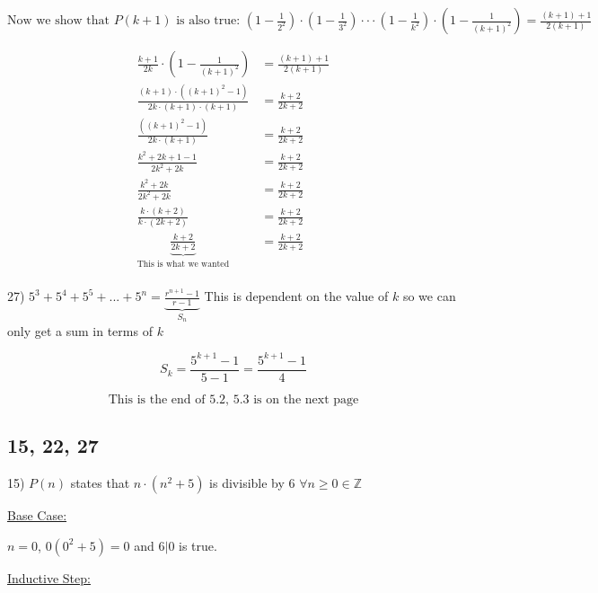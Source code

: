 \documentclass[11pt]{article}
\begin{document}
\begin{flushleft}
$\text{Now we show that $P(k+1)$ is also true: }
\displaystyle{\left(1-\frac{1}{2^2}\right)\cdot\left(1-\frac{1}{3^2}\right)\cdot \cdot \cdot\left(1-\frac{1}{k^2}\right)\cdot\left(1-\frac{1}{(k+1)^2}\right)} = \displaystyle{\frac{(k+1)+1}{2(k+1)}}$

\begin{align*}
\displaystyle{\frac{k+1}{2k}\cdot\left(1-\frac{1}{(k+1)^2}\right)} &= \displaystyle{\frac{(k+1)+1}{2(k+1)}}\\
\displaystyle{\frac{(k+1)\cdot ((k+1)^2-1)}{2k\cdot (k+1)\cdot (k+1)}} &= \displaystyle{\frac{k+2}{2k+2}}\\
\displaystyle{\frac{((k+1)^2-1)}{2k\cdot (k+1)}} &= \displaystyle{\frac{k+2}{2k+2}}\\
\displaystyle{\frac{k^2+2k+1-1}{2k^2+2k}} &= \displaystyle{\frac{k+2}{2k+2}}\\
\displaystyle{\frac{k^2+2k}{2k^2+2k}} &= \displaystyle{\frac{k+2}{2k+2}}\\
\displaystyle{\frac{k\cdot (k+2)}{k\cdot (2k+2)}} &= \displaystyle{\frac{k+2}{2k+2}}\\
\displaystyle{\underbrace{\frac{k+2}{2k+2}}\limits_{\text{This is what we wanted}}} &= \displaystyle{\frac{k+2}{2k+2}}\\
\end{align*}

\hrulefill

\vspace{3mm}
27) $\displaystyle{5^3+5^4+5^5+...+5^n = \underbrace{\frac{r^{n+1}-1}{r-1}}\limits_{S_n}}$ This is dependent on the value of $k$ so we can only get a sum in terms of $k$

$$S_k = \frac{5^{k+1}-1}{5-1} = \frac{5^{k+1}-1}{4}$$

\hrulefill
$$\text{This is the end of 5.2, 5.3 is on the next page}$$
\newpage
\subsection{15, 22, 27}

15) $P(n)$ states that $n\cdot (n^2 + 5)$ is divisible by 6 $\forall n\geq 0 \in \mathbb{Z}$

\vspace{3mm}

\underline{Base Case:} 

$n=0$, $0(0^2+5) = 0$ and $6|0$ is true.

\vspace{3mm}

\underline{Inductive Step:} 


\end{flushleft}
\end{document}
